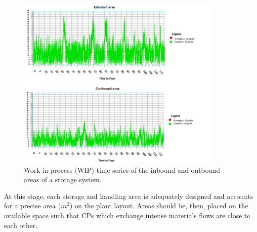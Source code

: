 \begin{figure}[hbt!]
\centering
\includegraphics[width=0.9\textwidth]{SectionWarehouses/design_figures/fig_DES_WIP.png}
\captionsetup{type=figure}
\caption{Work in process (WIP) time series of the inbound and outbound areas of a storage system.}
\label{fig_DES_WIP}
\end{figure}

At this stage, each storage and handling area is adequately designed and accounts for a precise area ($m^2$) on the plant layout. Areas should be, then, placed on the available space such that CPs which exchange intense materials flows are close to each other.











